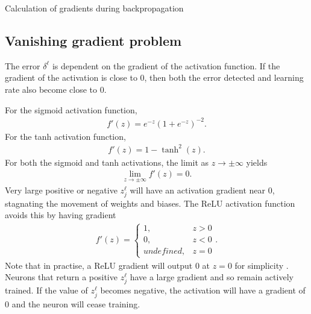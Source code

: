 \begin{algorithm}[H]
\label{nnets-bprop-alg}
\SetAlgoLined
{}
\caption{Calculation of gradients during backpropagation}
\end{algorithm}




\subsection*{Vanishing gradient problem}\label{nnet-vanishinggradprob}
The error $\delta^\ell$ is dependent on the gradient of the activation function. If the gradient of the activation is close to 0, then both the error detected and learning rate also become close to 0.

\noindent For the sigmoid activation function,
\begin{align}
	f '(z) = e^{-z}(1+e^{-z})^{-2}.
\end{align}
For the tanh activation function,
\begin{align}
	f '(z) = 1-\tanh^2(z).
\end{align}
For both the sigmoid and tanh activations, the limit as $z\rightarrow\pm\infty$ yields 
\begin{align}
	\lim_{z\rightarrow\pm\infty}f '(z)= 0.
\end{align}
Very large positive or negative $z_j^\ell$ will have an activation gradient near 0, stagnating the movement of weights and biases. The ReLU activation function avoids this by having gradient
\begin{align}
	f '(z) = \begin{cases}
		1, & z > 0 \\
		0, & z < 0 \\
		undefined, & z = 0
	\end{cases}.
\end{align}
Note that in practise, a ReLU gradient will output 0 at $z = 0$ for simplicity \citep{Goodfellow-et-al-2016}. Neurons that return a positive $z_j^\ell$ have a large gradient and so remain actively trained. If the value of $z_j^\ell$ becomes negative, the activation will have a gradient of 0 and the neuron will cease training. 


